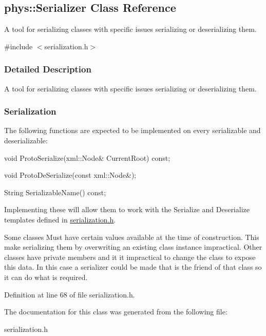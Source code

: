 \hypertarget{classphys_1_1Serializer}{
\subsection{phys::Serializer Class Reference}
\label{classphys_1_1Serializer}
}


A tool for serializing classes with specific issues serializing or deserializing them.  




{\ttfamily \#include $<$serialization.h$>$}



\subsubsection{Detailed Description}
A tool for serializing classes with specific issues serializing or deserializing them. \hypertarget{classphys_1_1Serializer_Serialization}{}\subsubsection{Serialization}\label{classphys_1_1Serializer_Serialization}
The following functions are expected to be implemented on every serializable and deserializable:\par
 void ProtoSerialize(xml::Node\& CurrentRoot) const; \par
 void ProtoDeSerialize(const xml::Node\&); \par
 String SerializableName() const; \par
 Implementing these will allow them to work with the Serialize and Deserialize templates defined in \hyperlink{serialization_8h_source}{serialization.h}.

Some classes Must have certain values available at the time of construction. This make serializing them by overwriting an existing class instance impractical. Other classes have private members and it it impractical to change the class to expose this data. In this case a serializer could be made that is the friend of that class so it can do what is required. 

Definition at line 68 of file serialization.h.



The documentation for this class was generated from the following file:\begin{DoxyCompactItemize}
\item 
serialization.h\end{DoxyCompactItemize}
